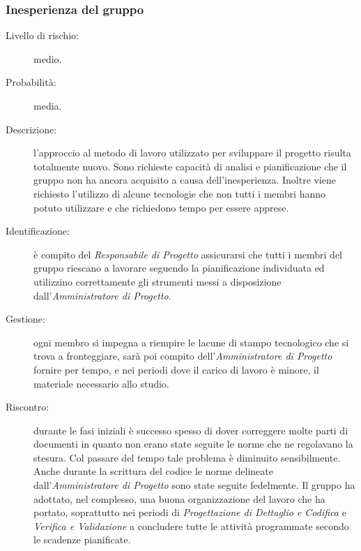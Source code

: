 \subsubsection{Inesperienza del gruppo}
\begin{description}
	\item[Livello di rischio:] medio.
	\item[Probabilità:] media.
	\item[Descrizione:] l'approccio al metodo di lavoro utilizzato per sviluppare il progetto risulta totalmente nuovo. Sono richieste capacità di analisi	e pianificazione che il gruppo non ha ancora acquisito a causa dell'inesperienza. Inoltre viene richiesto l'utilizzo di alcune tecnologie che non tutti i membri hanno potuto utilizzare e che richiedono tempo per essere apprese.
	\item[Identificazione:] è compito del \textit{Responsabile di Progetto} assicurarsi che tutti i membri del gruppo riescano a lavorare seguendo la pianificazione individuata ed utilizzino correttamente gli strumenti messi a disposizione dall'\textit{Amministratore di Progetto}.
	\item[Gestione:] ogni membro si impegna a riempire le lacune di stampo tecnologico che si trova a fronteggiare, sarà poi compito dell'\textit{Amministratore di Progetto} fornire per tempo, e nei periodi dove il carico di lavoro è minore, il materiale necessario allo studio.
	\item[Riscontro:] durante le fasi iniziali è successo spesso di dover correggere molte parti di documenti in quanto non erano state seguite le norme che ne regolavano la stesura. Col passare del tempo tale problema è diminuito sensibilmente. Anche durante la scrittura del codice le norme delineate dall'\textit{Amministratore di Progetto} sono state seguite fedelmente. Il gruppo ha adottato, nel complesso, una buona organizzazione del lavoro che ha portato, soprattutto nei periodi di \textit{Progettazione di Dettaglio e Codifica} e \textit{Verifica e Validazione} a concludere tutte le attività programmate secondo le scadenze pianificate.
\end{description}


